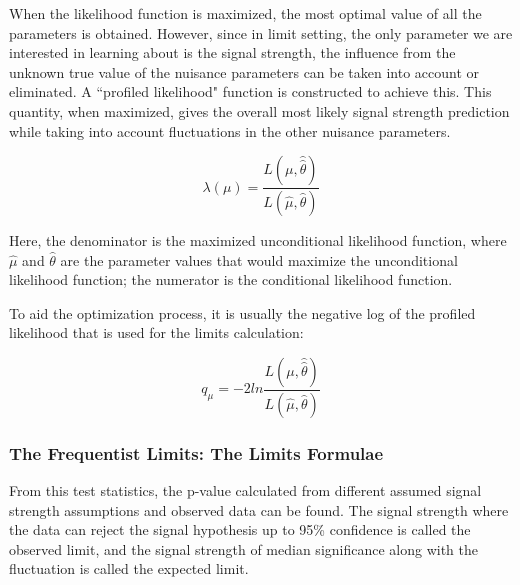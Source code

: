 When the likelihood function is maximized, the most optimal value of all the parameters is obtained. However, since in limit setting, the only parameter we are interested in learning about is the signal strength, the influence from the unknown true value of the nuisance parameters can be taken into account or eliminated. A ``profiled likelihood" function is constructed to achieve this. This quantity, when maximized, gives the overall most likely signal strength prediction while taking into account fluctuations in the other nuisance parameters. 

\begin{equation}
\lambda(\mu) = \frac{L(\mu, \hat{\hat{\theta}})}{L(\hat{\mu}, \hat{\theta})}
\label{eq:profilelikelihood}
\end{equation}

Here, the denominator is the maximized unconditional likelihood function, where $\hat{\mu}$ and $\hat{\theta}$ are the parameter values that would maximize the unconditional likelihood function; the numerator is the conditional likelihood function.

To aid the optimization process, it is usually the negative log of the profiled likelihood that is used for the limits calculation:

\begin{equation}
    q_{\mu} = -2 ln \frac{L(\mu, \hat{\hat{\theta}})}{L(\hat{\mu}, \hat{\theta})}
\label{teststats}
\end{equation}


\subsubsection{The Frequentist Limits: The Limits Formulae}
\label{sec:freqlimits}

From this test statistics, the p-value calculated from different assumed signal strength assumptions and observed data can be found. The signal strength where the data can reject the signal hypothesis up to 95\% confidence is called the observed limit, and the signal strength of median significance along with the fluctuation is called the expected limit. 

